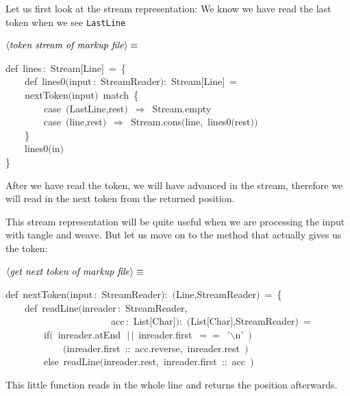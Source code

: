 \documentclass[a4paper,12pt]{article}
\begin{document}
Let us first look at the stream representation: We know we have read the
last token when we see \texttt{LastLine}

$\left<\mbox{\emph{token stream of markup file}}\right>\equiv$
\begin{program}{\vem def}~lines\,{\rm :}~Stream$[$Line$]$~=~{\small\{}
\\~~~~{\vem def}~lines0$($input\,{\rm :}~StreamReader$)${\rm :}~Stream$[$Line$]$~=
\\~~~~nextToken$($input$)$~{\vem match}~{\small\{}
\\~~~~~~~~{\vem case}~$($LastLine,rest$)$~$\Rightarrow$~Stream.empty
\\~~~~~~~~{\vem case}~$($line,rest$)$~$\Rightarrow$~Stream.cons$($line,~lines0$($rest$)$$)$
\\~~~~{\small\}}
\\~~~~lines0$($in$)$
\\{\small\}}
\\[0.5em]\end{program}
After we have read the token, we will have advanced in the stream, therefore
we will read in the next token from the returned position.

This stream representation will be quite useful when we are processing
the input with tangle and weave. But let us move on to the method that
actually gives us the token:

$\left<\mbox{\emph{get next token of markup file}}\right>\equiv$
\begin{program}{\vem def}~nextToken$($input\,{\rm :}~StreamReader$)${\rm :}~$($Line,StreamReader$)$~=~{\small\{}
\\~~~~{\vem def}~readLine$($inreader\,{\rm :}~StreamReader,
\\~~~~~~~~~~~~~~~~~~~~~~acc\,{\rm :}~List$[$Char$]$$)${\rm :}~$($List$[$Char$]$,StreamReader$)$~=
\\~~~~~~~~{\vem if}$($~inreader.atEnd~$\,|$$\,|$~inreader.first~$==$~'$\backslash$n'~$)$
\\~~~~~~~~~~~~$($inreader.first~{\rm :}{\rm :}~acc.reverse,~inreader.rest~$)$
\\~~~~~~~~{\vem else}~readLine$($inreader.rest,~inreader.first~{\rm :}{\rm :}~acc~$)$
\\[0.5em]\end{program}
This little function reads in the whole line and returns the position
afterwards.
\end{document}
